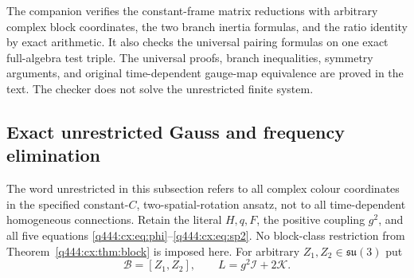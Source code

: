 The companion  verifies the constant-frame
matrix reductions with arbitrary complex block coordinates, the two branch
inertia formulas, and the ratio identity by exact arithmetic. It also checks
the universal pairing formulas on one exact full-algebra test triple.
The universal proofs, branch inequalities, symmetry arguments, and original
time-dependent gauge-map equivalence are proved in the text. The checker
does not solve the unrestricted finite system.

\subsection{Exact unrestricted Gauss and frequency elimination}
\label{q444:complex-elimination-section}

The word unrestricted in this subsection refers to all complex colour
coordinates in the specified constant-$C$, two-spatial-rotation ansatz,
not to all time-dependent homogeneous connections. Retain the literal
$H,q,F$, the positive coupling $g^2$, and all five equations
\eqref{q444:cx:eq:phi}--\eqref{q444:cx:eq:sp2}. No block-class restriction
from Theorem~\ref{q444:cx:thm:block} is imposed here.
For arbitrary $Z_1,Z_2\in\mathfrak{su}(3)$ put
\[
 \mathscr B=[Z_1,Z_2],\qquad L=g^2\mathcal I+2\mathcal K.
\]

